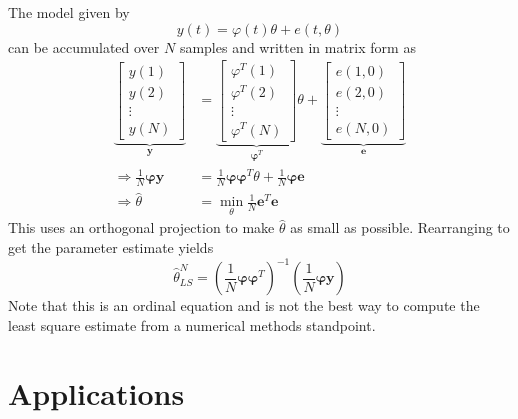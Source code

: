 \documentclass[lecture,12pt,]{pcms-l}
\theoremstyle{example}
\newcommand{\thn}{\hat{\theta}_{LS}^N}
\begin{document}
The model given by
$$y(t) = \varphi(t)\theta + e(t,\theta)$$
can be accumulated over $N$ samples and written in matrix form as
\begin{align*}
\underbrace{\left[\begin{array}{c} y(1) \\ y(2) \\ \vdots \\ y(N) \end{array}\right]}_{\mathbf{y}} &= \underbrace{\left[\begin{array}{c} \varphi^T(1) \\ \varphi^T(2) \\ \vdots \\ \varphi^T(N) \end{array}\right]}_{\mathbf{\varphi}^T} \theta
+ \underbrace{\left[\begin{array}{c} e(1,0) \\ e(2,0) \\ \vdots \\ e(N,0) \end{array}\right]}_{\mathbf{e}} \\
\Rightarrow \frac{1}{N}\mathbf{\varphi}\mathbf{y} &= \frac{1}{N}\mathbf{\varphi}\mathbf{\varphi}^T\theta + \frac{1}{N}\mathbf{\varphi}\mathbf{e} \\
\Rightarrow \hat{\theta} &= \min_\theta \frac{1}{N}\mathbf{e}^T\mathbf{e}
\end{align*}
This uses an orthogonal projection to make $\hat{\theta}$ as small as possible. Rearranging to get the parameter estimate yields
$$\thn = (\frac{1}{N}\mathbf{\varphi\varphi}^T)^{-1} (\frac{1}{N}\mathbf{\varphi y})$$
Note that this is an ordinal equation and is not the best way to compute the least square estimate from a numerical methods standpoint.

\section{Applications}
\end{document}
